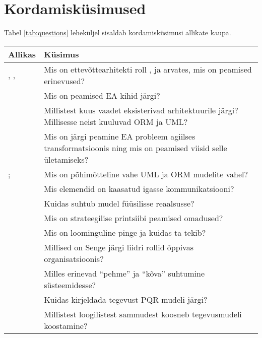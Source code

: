 \documentclass[nobib]{tufte-handout}
\begin{document}
\section{Kordamisküsimused}
Tabel \ref{tab:questions} leheküljel \pageref{tab:questions} sisaldab kordamisküsimusi allikate kaupa. 

\begin{table*}[ht]
\small
	\centering
	\selectfont
	\begin{tabular}{p{4.5cm}p{11cm}}
		\toprule
		Allikas & Küsimus \\
		\midrule
		\cite{parsons2005enterprise}, \cite{sysengineering}, \cite{winter2006essential} & Mis on ettevõttearhitekti roll \citeauthor{parsons2005enterprise}, \citeauthor{sysengineering} ja \citeauthor{winter2006essential} arvates, mis on peamised erinevused?\\
		\cite{winter2006essential} & Mis on peamised EA kihid \cite{winter2006essential} järgi?\\
		\cite{sysengineering} & Millistest kuus vaadet eksisterivad arhitektuurile \citeauthor{sysengineering} järgi? Millisesse neist kuuluvad ORM ja UML? \\
		\cite{hickey} & Mis on \citeauthor{hickey} järgi peamine EA probleem agiilses transformatsioonis ning mis on peamised viisid selle ületamiseks? \\
\cite{OPM}; \cite{heumann2005introduction} & Mis on põhimõtteline vahe UML ja ORM mudelite vahel? \\
\cite[peatükk 3]{ferenvcik2004survey} &  Mis elemendid on kaasatud igasse kommunikatsiooni?\\
\cite{box1976science}&  Kuidas suhtub mudel füüsilisse reaalsusse?\\
\cite{gadiesh2001transforming} & Mis on strateegilise printsiibi peamised omadused? \\
\cite{senge2002leader} & Mis on loominguline pinge ja kuidas ta tekib? \\
& Millised on Senge järgi liidri rollid õppivas organisatsioonis? \\

\cite{checkland2000soft} & Milles erinevad \enquote{pehme} ja \enquote{kõva} suhtumine süsteemidesse? \\
 & Kuidas kirjeldada tegevust PQR mudeli järgi?\\
 & Millistest loogilistest sammudest koosneb tegevusmudeli koostamine?\\


\end{tabular}
\end{table*}
\end{document}
